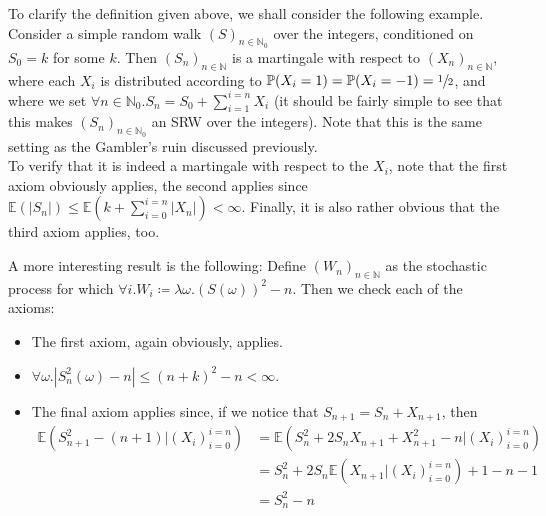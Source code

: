 	To clarify the definition given above, we shall consider the following example. Consider 
	a simple random walk $(S)_{n \in \mathbb{N}_0}$ over the integers, conditioned
	on $S_0 = k$ for some $k$. Then $(S_n)_{n\in \mathbb{N}}$ is a martingale with respect to 
	$(X_n)_{n \in \mathbb{N}}$, where each $X_i$ is distributed according to $\mathbb{P}(X_i=1)
	=\mathbb{P}(X_i=-1)=\sfrac{1}{2}$, and where we set $\forall n \in \mathbb{N}_0 . S_n = S_0 
	+ \sum_{i=1}^{i=n} X_i$ (it should be fairly simple to see that this makes $(S_n)_{n\in
	\mathbb{N}_0}$ an SRW over the integers). Note that this is the same setting as the 
	Gambler's ruin discussed previously. 
	\\
	To verify that it is indeed a martingale with respect to the $X_i$, note that the first 
	axiom obviously applies, the second applies since $\mathbb{E}(|S_n|) \leq \mathbb{E}\left(k+
	\sum_{i=0}^{i=n} |X_n|\right)< \infty$. Finally, it is also rather obvious that the third 
	axiom applies, too.\par 

	A more interesting result is the following: Define $(W_n)_{n \in \mathbb{N}}$ as the 
	stochastic process for which $\forall i . W_i \coloneqq \lambda \omega . (S(\omega))^2-n$.
	Then we check each of the axioms:
	\begin{itemize}
		\item The first axiom, again obviously, applies.
		\item $\forall \omega . |S_n^2(\omega) - n| \leq (n+k)^2 - n < \infty$.
		\item The final axiom applies since, if we notice that $S_{n+1}= S_n +X_{n+1}$, 
		then
		\begin{align*}
			\mathbb{E}(S_{n+1}^2-(n+1)|(X_i)_{i=0}^{i=n}) &= \mathbb{E}(S_n^2+2S_n
			X_{n+1}+X_{n+1}^2 - n|(X_i)_{i=0}^{i=n}) \\
			&= S_n^2 + 2S_n \mathbb{E}(X_{n+1}|(X_i)_{i=0}^{i=n}) + 1 - n -1 \\
			&= S_n^2 - n
		\end{align*}
	\end{itemize}
	
